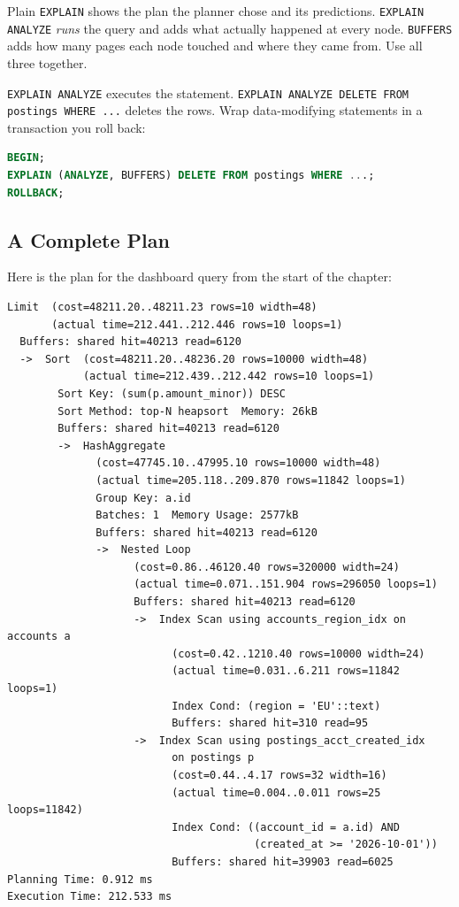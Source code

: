 Plain \texttt{EXPLAIN} shows the plan the planner chose and its predictions. \texttt{EXPLAIN ANALYZE} \emph{runs} the query and adds what actually happened at every node. \texttt{BUFFERS} adds how many pages each node touched and where they came from. Use all three together.

\begin{trapbox}
\texttt{EXPLAIN ANALYZE} executes the statement. \texttt{EXPLAIN ANALYZE DELETE FROM postings WHERE ...} deletes the rows. Wrap data-modifying statements in a transaction you roll back:
\begin{lstlisting}[language=SQL]
BEGIN;
EXPLAIN (ANALYZE, BUFFERS) DELETE FROM postings WHERE ...;
ROLLBACK;
\end{lstlisting}
\end{trapbox}

\subsection{A Complete Plan}

Here is the plan for the dashboard query from the start of the chapter:

\begin{lstlisting}[language=Plain]
Limit  (cost=48211.20..48211.23 rows=10 width=48)
       (actual time=212.441..212.446 rows=10 loops=1)
  Buffers: shared hit=40213 read=6120
  ->  Sort  (cost=48211.20..48236.20 rows=10000 width=48)
            (actual time=212.439..212.442 rows=10 loops=1)
        Sort Key: (sum(p.amount_minor)) DESC
        Sort Method: top-N heapsort  Memory: 26kB
        Buffers: shared hit=40213 read=6120
        ->  HashAggregate
              (cost=47745.10..47995.10 rows=10000 width=48)
              (actual time=205.118..209.870 rows=11842 loops=1)
              Group Key: a.id
              Batches: 1  Memory Usage: 2577kB
              Buffers: shared hit=40213 read=6120
              ->  Nested Loop
                    (cost=0.86..46120.40 rows=320000 width=24)
                    (actual time=0.071..151.904 rows=296050 loops=1)
                    Buffers: shared hit=40213 read=6120
                    ->  Index Scan using accounts_region_idx on accounts a
                          (cost=0.42..1210.40 rows=10000 width=24)
                          (actual time=0.031..6.211 rows=11842 loops=1)
                          Index Cond: (region = 'EU'::text)
                          Buffers: shared hit=310 read=95
                    ->  Index Scan using postings_acct_created_idx
                          on postings p
                          (cost=0.44..4.17 rows=32 width=16)
                          (actual time=0.004..0.011 rows=25 loops=11842)
                          Index Cond: ((account_id = a.id) AND
                                       (created_at >= '2026-10-01'))
                          Buffers: shared hit=39903 read=6025
Planning Time: 0.912 ms
Execution Time: 212.533 ms
\end{lstlisting}

